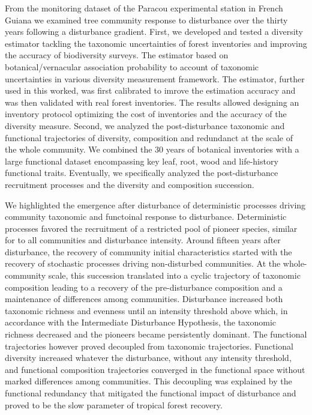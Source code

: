 \documentclass[
  11pt,
  french,
  A4paper,
  extrafontsizes,onecolumn,openright
  ]{memoir}
\begin{document}
\begin{normalsize}
\begin{description}
From the monitoring dataset of the Paracou experimental station in
French Guiana we examined tree community response to disturbance over
the thirty years following a disturbance gradient. First, we developed
and tested a diversity estimator tackling the taxonomic uncertainties of
forest inventories and improving the accuracy of biodiversity surveys.
The estimator based on botanical/vernacular association probability to
account of taxonomic uncertainties in various diversity measurement
framework. The estimator, further used in this worked, was first
calibrated to imrove the estimation accuracy and was then validated with
real forest inventories. The results allowed designing an inventory
protocol optimizing the cost of inventories and the accuracy of the
diversity measure. Second, we analyzed the post-disturbance taxonomic
and functional trajectories of diversity, composition and redundanct at
the scale of the whole community. We combined the 30 years of botanical
inventories with a large functional dataset encompassing key leaf, root,
wood and life-history functional traits. Eventually, we specifically
analyzed the post-disturbance recruitment processes and the diversity
and composition succession.\newline

We highlighted the emergence after disturbance of deterministic
processes driving community taxonomic and functoinal response to
disturbance. Deterministic processes favored the recruitment of a
restricted pool of pioneer species, similar for to all communities and
disturbance intensity. Around fifteen years after disturbance, the
recovery of community initial characteristics started with the recovery
of stochastic processes driving non-disturbed communities. At the
whole-community scale, this succession translated into a cyclic
trajectory of taxonomic composition leading to a recovery of the
pre-disturbance composition and a maintenance of differences among
communities. Disturbance increased both taxonomic richness and evenness
until an intensity threshold above which, in accordance with the
Intermediate Disturbance Hypothesis, the taxonomic richness decreased
and the pioneers became persistently dominant. The functional
trajectories however proved decoupled from taxonomic trajectories.
Functional diversity increased whatever the disturbance, without any
intensity threshold, and functional composition trajectories converged
in the functional space without marked differences among communities.
This decoupling was explained by the functional redundancy that
mitigated the functional impact of disturbance and proved to be the slow
parameter of tropical forest recovery.\newline


\end{description}
\end{normalsize}
\end{document}
